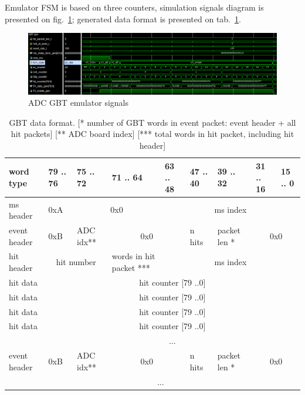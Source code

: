 \documentclass{article}
\begin{document}
Emulator FSM is based on three counters, simulation signals diagram is presented on fig.~\ref{fig:gbt-emu-sg}; generated data format is presented on tab.~\ref{tab:gbt-emu-format}.

\begin{figure}[H]
	\centering 
	\includegraphics[width=1.0\textwidth]{pic_signals/adc-gbt-emu.png}
	\caption{\label{fig:gbt-emu-sg} ADC GBT emulator signals}
\end{figure}

\begin{table}[H]
\centering
\begin{tabular}{| l | l | l | l | l | l | l | l | l |}
\hline
word type & 79 .. 76 & 75 .. 72 & 71 .. 64 & 63 .. 48 & 47 .. 40 & 39 .. 32 & 31 .. 16 & 15 .. 0 \\ \hline
ms header & 0xA & \multicolumn{2}{c|}{0x0}  & \multicolumn{5}{c|}{ms index} \\ \hline
event header & 0xB & ADC idx** & \multicolumn{2}{c|}{0x0} & n hits & packet len * & \multicolumn{2}{c|}{0x0} \\ \hline
hit header & \multicolumn{2}{c|}{hit number} & words in hit packet *** & \multicolumn{5}{c|}{ms index} \\ \hline
hit data & \multicolumn{8}{c|}{hit counter [79 ..0]} \\ \hline
hit data & \multicolumn{8}{c|}{hit counter [79 ..0]} \\ \hline
hit data & \multicolumn{8}{c|}{hit counter [79 ..0]} \\ \hline
hit data & \multicolumn{8}{c|}{hit counter [79 ..0]} \\ \hline
  & \multicolumn{8}{c|}{ ... } \\ \hline

event header & 0xB & ADC idx** & \multicolumn{2}{c|}{0x0} & n hits & packet len * & \multicolumn{2}{c|}{0x0} \\ \hline
  & \multicolumn{7}{c|}{ ... } \\ \hline

\end{tabular}
\caption{GBT data format. [* number of GBT words in event packet: event header + all hit packets] [** ADC board index] [*** total words in hit packet, including hit header]\label{tab:gbt-emu-format}}
\end{table}
\end{document}
